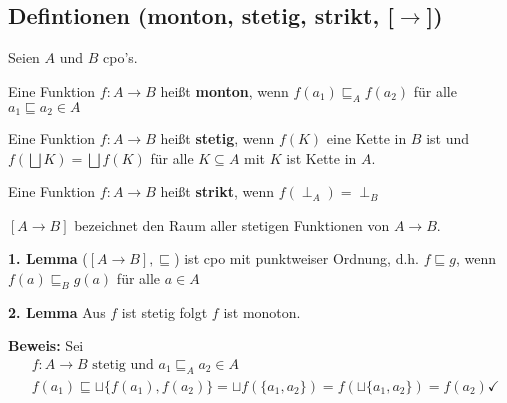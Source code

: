 \begin{compactitem}
\subsection{Defintionen (monton, stetig, strikt, [$\rightarrow$])}
Seien $A$ und $B$ cpo's. 
\begin{compactitem}
	\item Eine Funktion $f: A \rightarrow B$ heißt \textbf{monton}, wenn $f(a_1) \sqsubseteq_A f(a_2)$ für alle $a_1 \sqsubseteq a_2 \in A$
	\item Eine Funktion $f: A \rightarrow B$ heißt \textbf{stetig}, wenn $f(K)$ eine Kette in $B$ ist und $f(\bigsqcup K) = \bigsqcup f(K)$ für alle $K \subseteq A$ mit $K$ ist Kette in $A$.
	\item Eine Funktion $f: A \rightarrow B$ heißt \textbf{strikt}, wenn $f(\perp_A) = \perp_B$
	\item $[A\rightarrow B]$ bezeichnet den Raum aller stetigen Funktionen von $A \rightarrow B$.
	\item[\textbf{1. Lemma}] ($[A\rightarrow B], \sqsubseteq$) ist cpo mit punktweiser Ordnung, d.h. $f \sqsubseteq g$, wenn $f (a) \sqsubseteq_B g(a)$ für alle $a \in A$
	\item[\textbf{2. Lemma}] Aus $f$ ist stetig folgt $f$ ist monoton.
	\item[\textbf{Beweis:}] Sei
	\begin{align*}
	&f: A \rightarrow B \text{ stetig und } a_1 \sqsubseteq_A a_2 \in A\\
	&f(a_1) \sqsubseteq \sqcup\{f(a_1), f(a_2) \} = \sqcup f(\{a_1, a_2\}) = f (\sqcup\{a_1, a_2\}) = f(a_2) \checkmark\\
	\end{align*}
\end{compactitem}

\end{compactitem}
